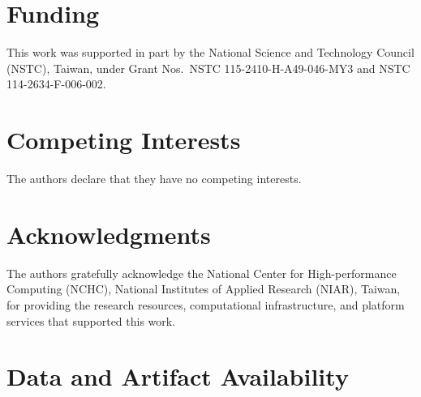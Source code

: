 \documentclass[11pt]{article}
\begin{document}
\section*{Funding}

\begin{sloppypar}
This work was supported in part by the National Science and Technology Council (NSTC), Taiwan, under Grant Nos.\ NSTC 115-2410-H-A49-046-MY3 and NSTC 114-2634-F-006-002.
\end{sloppypar}

\section*{Competing Interests}

The authors declare that they have no competing interests.

\section*{Acknowledgments}

The authors gratefully acknowledge the National Center for High-performance Computing (NCHC), National Institutes of Applied Research (NIAR), Taiwan, for providing the research resources, computational infrastructure, and platform services that supported this work.

\section*{Data and Artifact Availability}
\end{document}
